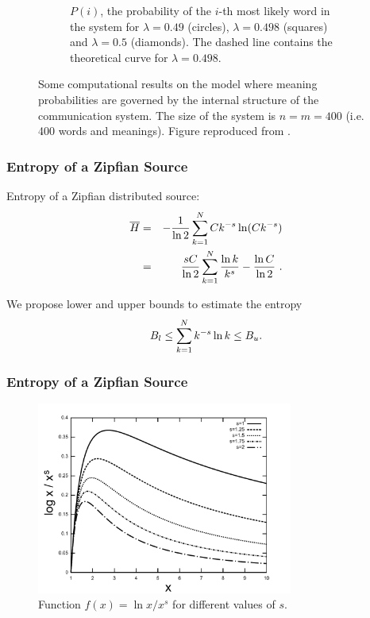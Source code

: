 \documentclass[notes]{beamer}
\begin{document}
{\begin{figure}
\begin{subfigure}[b]{0.5\textwidth}
{          \vspace{-0.2cm}
          \caption{\scriptsize $P(i)$, the probability of the $i$-th most likely word in the system for $\lambda  = 0.49$ (circles), $\lambda = 0.498$ (squares) and $\lambda = 0.5$ (diamonds). The dashed line contains the theoretical curve for $\lambda = 0.498$.}
          \label{fig:cancho_figB}
          }
      \end{subfigure}
      \vspace{-0.6cm}
      \caption{\scriptsize Some computational results on the model where meaning probabilities are governed by the internal structure of the communication system. The size of the system is $n = m = 400$ (i.e. 400 words and meanings). Figure reproduced from \cite{cancho2005}.}
        \label{fig:cancho}
\end{figure}
}



\frame
{
  \frametitle{Entropy of a Zipfian Source}
  Entropy of a Zipfian distributed source:
  \begin{eqnarray}
  \label{eq:ent_zipfian_source}
  \overline{H} &=& -\frac{1}{\ln 2} \sum_{k=1}^N Ck^{-s} \ln (Ck^{-s}) \nonumber \\
               &=& \frac{sC}{\ln 2} \sum_{k=1}^N \frac{\ln k}{k^s} - \frac{\ln C}{\ln 2} \textmd{ .}
  \end{eqnarray} 

  We propose lower and upper bounds to estimate the entropy
  \begin{equation}
  B_l \leq \sum_{k=1}^{N} k^{-s} \ln k \leq B_u \textmd{.}
  \end{equation}

}


\frame
{
  \frametitle{Entropy of a Zipfian Source}
  \begin{figure}[h]
  \centering
  \includegraphics[width=0.75\textwidth]{images/logk_ks.pdf}
  \caption{Function $f(x)=\ln x / x^s$ for different values of $s$.}
  \label{fig:logk_ks}
  \end{figure}
}
\end{document}
